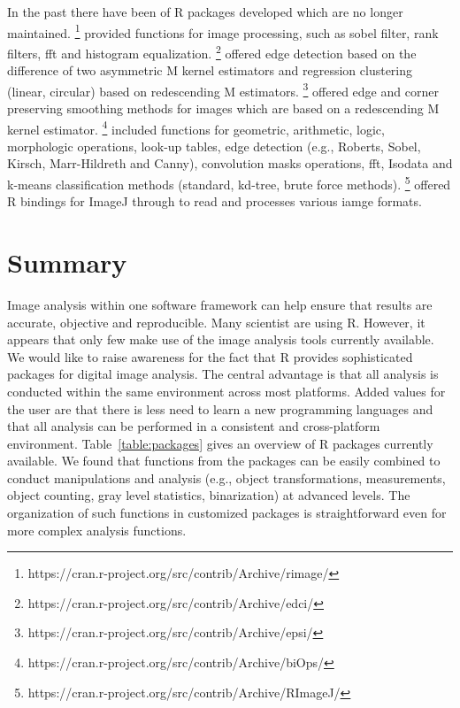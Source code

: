 In the past there have been of R packages developed which are no longer 
maintained. 
\footnote{https://cran.r-project.org/src/contrib/Archive/rimage/ 
} provided functions for image processing, such as sobel filter, rank filters, 
fft and histogram equalization. 
\footnote{https://cran.r-project.org/src/contrib/Archive/edci/} 
offered edge detection based on the difference of two asymmetric M kernel 
estimators and regression clustering (linear, circular) based on redescending M 
estimators. 
\footnote{https://cran.r-project.org/src/contrib/Archive/epsi/} 
offered edge and corner preserving smoothing methods for images which are based 
on a redescending M kernel estimator. 
\footnote{https://cran.r-project.org/src/contrib/Archive/biOps/} 
included functions for geometric, arithmetic, logic, morphologic operations, 
look-up tables, edge detection (e.g., Roberts, Sobel, Kirsch, Marr-Hildreth and 
Canny), convolution masks operations, fft, Isodata and k-means classification methods 
(standard, kd-tree, brute force methods). \footnote{ 
https://cran.r-project.org/src/contrib/Archive/RImageJ/} offered R bindings for 
ImageJ through  to read and processes various iamge formats.

\section{Summary}

Image analysis within one software framework can help ensure that results are 
accurate, objective and reproducible. Many scientist are using R. However, it 
appears that only few make use of the image analysis tools currently available. 
We would like to raise awareness for the fact that R provides sophisticated 
packages for digital image analysis. The central advantage is that all analysis 
is conducted within the same environment across most  platforms. Added values 
for the user are that there is less need to learn a new programming languages 
and that all analysis can be performed in a consistent and cross-platform 
environment. Table~\ref{table:packages} gives an overview of R packages 
currently available. We found that functions from the packages can be easily 
combined to conduct manipulations and analysis (e.g., object transformations, 
measurements, object counting, gray level statistics, binarization) at advanced 
levels. The organization of such functions in customized packages is 
straightforward even for more complex analysis functions.

